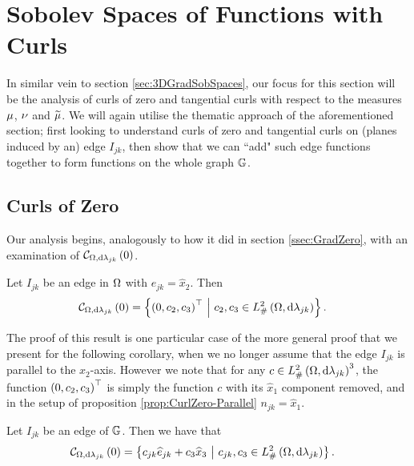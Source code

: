 \section{Sobolev Spaces of Functions with Curls} \label{sec:CC-CurlAnalysis}
In similar vein to section \ref{sec:3DGradSobSpaces}, our focus for this section will be the analysis of curls of zero and tangential curls with respect to the measures $\mu$, $\nu$ and $\widetilde{\mu}$.
We will again utilise the thematic approach of the aforementioned section; first looking to understand curls of zero and tangential curls on (planes induced by an) edge $I_{jk}$, then show that we can ``add" such edge functions together to form functions on the whole graph $\mathbb{G}$.

\subsection{Curls of Zero} \label{ssec:CurlsOfZero}
Our analysis begins, analogously to how it did in section \ref{ssec:GradZero}, with an examination of $\mathcal{C}_{ \Omega, \mathrm{d}\lambda_{jk}}\left( 0 \right)$.
\begin{prop} \label{prop:CurlZero-Parallel}
	Let $I_{jk}$ be an edge in $\Omega$ with $e_{jk} = \widehat{x}_2$.
	Then
	\begin{align*}
		\mathcal{C}_{ \Omega, \mathrm{d}\lambda_{jk}}\left( 0 \right) &= \left\{  \left( 0,c_2,c_3 \right)^\top \ \middle\vert \  c_2,c_3\in L^2_{\#}\left( \Omega,\mathrm{d} \lambda_{jk} \right)  \right\}.
	\end{align*}
\end{prop}
The proof of this result is one particular case of the more general proof that we present for the following corollary, when we no longer assume that the edge $I_{jk}$ is parallel to the $x_2$-axis.
However we note that for any $c\in L^2_{\#}\left( \Omega,\mathrm{d} \lambda_{jk} \right)^3$, the function $\left( 0,c_2,c_3 \right)^{\top}$ is simply the function $c$ with its $\widehat{x}_1$ component removed, and in the setup of proposition \ref{prop:CurlZero-Parallel} $n_{jk} = \widehat{x}_1$.
\begin{cory} \label{cory:CurlZero-Rotated}
	Let $I_{jk}$ be an edge of $\mathbb{G}$.
	Then we have that
	\begin{align*}
		\mathcal{C}_{ \Omega, \mathrm{d}\lambda_{jk}}\left( 0 \right) &= \left\{  c_{jk}\widehat{e}_{jk} + c_3\widehat{x}_3 \ \middle\vert \  c_{jk},c_3\in L^2_{\#}\left( \Omega,\mathrm{d} \lambda_{jk} \right)  \right\}.
	\end{align*}
\end{cory}
